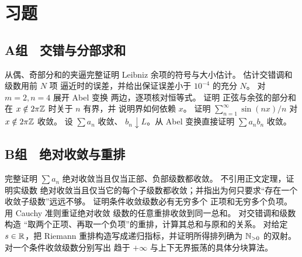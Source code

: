 \section*{习题}

\subsection*{A组　交错与分部求和}
\begin{enumerate}[label=\textbf{\thechapter.\arabic*.}]
  从偶、奇部分和的夹逼完整证明
 Leibniz 余项的符号与大小估计。
  估计交错调和级数用前 \(N\) 项
 逼近时的误差，并给出保证误差小于 \(10^{-4}\) 的充分 \(N\)。
  对 \(m=2,n=4\) 展开 Abel 变换
 两边，逐项核对恒等式。
  证明
 正弦与余弦的部分和在 \(x\notin2\pi\mathbb{Z}\) 时关于 \(n\) 有界，并
 说明界如何依赖 \(x\)。
  证明
 \(\sum_{n=1}^\infty\sin(nx)/n\) 对 \(x\notin2\pi\mathbb{Z}\) 收敛。
  设 \(\sum a_n\) 收敛、
 \(b_n\downarrow L\)。从 Abel 变换直接证明 \(\sum a_nb_n\) 收敛。
\end{enumerate}

\subsection*{B组　绝对收敛与重排}
\begin{enumerate}[label=\textbf{\thechapter.\arabic*.},resume]
  完整证明
 \(\sum a_n\) 绝对收敛当且仅当正部、负部级数都收敛。
  不引用正文定理，证明实级数
 绝对收敛当且仅当它的每个子级数都收敛；并指出为何只要求“存在一个
 收敛子级数”远远不够。
  证明条件收敛级数必有无穷多个
 正项和无穷多个负项。
  用 Cauchy 准则重证绝对收敛
 级数的任意重排收敛到同一总和。
  对交错调和级数构造
 “取两个正项、再取一个负项”的重排，计算其总和与原和的关系。
  对给定 \(s\in\mathbb{R}\)，把
 Riemann 重排构造写成递归指标，并证明所得排列确为 \(\mathbb{N}_{>0}\) 的双射。
  对一个条件收敛级数分别写出
 趋于 \(+\infty\) 与上下无界振荡的具体分块算法。
\end{enumerate}

